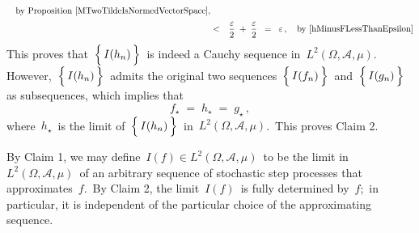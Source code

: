\begin{enumerate}
\begin{eqnarray*}
		\quad
		\textnormal{by Proposition \ref{MTwoTildeIsNormedVectorSpace}},
	\\
	& \overset{{\color{white}1}}{<} &
		\dfrac{\varepsilon}{2} \; + \; \dfrac{\varepsilon}{2}
	\;\; = \;\; \varepsilon\,,
		\quad
		\textnormal{by \eqref{hMinusFLessThanEpsilon}}
	\end{eqnarray*}
	This proves that \,$\left\{\,\overset{{\color{white}.}}{I(h_{n})}\,\right\}$\,
	is indeed a Cauchy sequence in \,$L^{2}(\Omega,\mathcal{A},\mu)$.
	However,
	\,$\left\{\,\overset{{\color{white}.}}{I(h_{n})}\,\right\}$\,
	admits the original two sequences
	\,$\left\{\,\overset{{\color{white}.}}{I(f_{n})}\,\right\}$\,
	and
	\,$\left\{\,\overset{{\color{white}.}}{I(g_{n})}\,\right\}$\,
	as subsequences, which implies that
	\begin{equation*}
	f_{\star} \; = \; h_{\star} \; = \; g_{\star}\,,
	\end{equation*}
	where \,$h_{\star}$\, is the limit of
	\,$\left\{\,\overset{{\color{white}.}}{I(h_{n})}\,\right\}$\,
	in \,$L^{2}(\Omega,\mathcal{A},\mu)$.\,
	This proves Claim 2.
	
	\vskip 0.5cm
	\noindent
	By Claim 1, we may define \,$I(f) \in L^{2}(\Omega,\mathcal{A},\mu)$\,
	to be the limit in \,$L^{2}(\Omega,\mathcal{A},\mu)$\, of an arbitrary
	sequence of stochastic step processes that approximates \,$f$.\,
	By Claim 2, the limit \,$I(f)$\, is fully determined by \,$f$;\, in particular,
	it is independent of the particular choice of the approximating sequence.


\end{enumerate}
